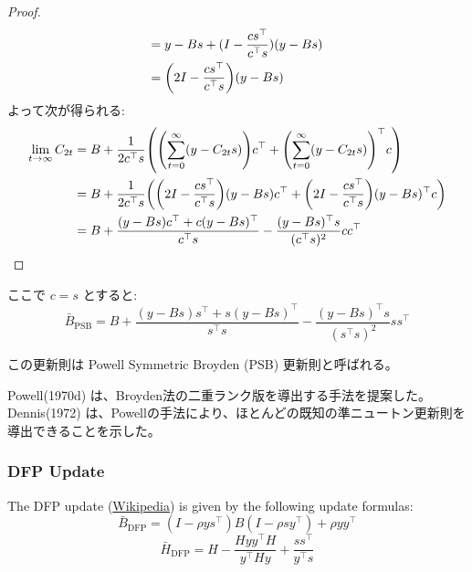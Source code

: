 \documentclass[a4paper, 10pt, dvipdfmx,draft]{article}
\begin{document}
\begin{proof}
\begin{align*}
        = {}                                                                            & y - B s + (I-\frac{c s^\top}{c^\top s})(y - B s)                                                               \\
        ={}                                                                             & \qty(2I - \frac{c s^\top}{c^\top s})(y - Bs)
    \end{align*}
    よって次が得られる:
    \begin{align*}
        \lim_{t \to \infty} C_{2t}
         & = B + \frac{1}{2 c^\top s} \qty(\qty(\sum_{t=0}^{\infty} (y - C_{2t}s)) c^\top + \qty(\sum_{t=0}^{\infty} (y - C_{2t}s))^\top c)           \\
         & = B + \frac{1}{2 c^\top s} \qty(\qty(2I - \frac{c s^\top}{c^\top s})(y - Bs) c^\top + \qty(2I - \frac{c s^\top}{c^\top s})(y - Bs)^\top c) \\
         & = B
        + \frac{(y - Bs)c^\top + c(y - Bs)^\top}{c^\top s}
        - \frac{(y - Bs)^\top s}{(c^\top s)^2} c c^\top
    \end{align*}
\end{proof}

ここで $c=s$ とすると:
\begin{equation}\label{eq:PSB_update}
    \bar{B}_{\mathrm{PSB}} = B + \frac{(y - Bs)s^\top + s(y - Bs)^\top}{s^\top s} - \frac{(y - Bs)^\top s}{(s^\top s)^2} ss^\top
\end{equation}

この更新則は Powell Symmetric Broyden (PSB) 更新則と呼ばれる。

Powell(1970d) は、Broyden法の二重ランク版を導出する手法を提案した。
Dennis(1972) は、Powellの手法により、ほとんどの既知の準ニュートン更新則を導出できることを示した。

\subsubsection{DFP Update}

The DFP update \cite{nocedal1999numerical} (\href{https://en.wikipedia.org/wiki/Davidon%E2%80%93Fletcher%E2%80%93Powell_formula}{Wikipedia}) is given by the following update formulas:
\begin{equation*}
    \bar{B}_{\mathrm{DFP}} = (I - \rho y s^\top) B (I - \rho s y^\top) + \rho y y^\top
\end{equation*}
\begin{equation*}
    \bar{H}_{\mathrm{DFP}} = H - \frac{H y y^\top H}{y^\top H y} + \frac{s s^\top}{y^\top s}
\end{equation*}
\end{document}
